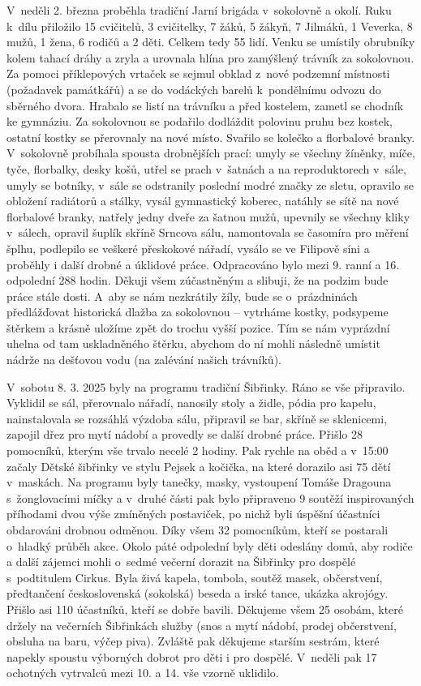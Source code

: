 \documentclass[11pt]{article}
\begin{document}
V~neděli 2. března proběhla tradiční Jarní brigáda v~sokolovně a okolí.
Ruku k~dílu přiložilo 15 cvičitelů, 3 cvičitelky, 7 žáků, 5 žákyň, 7
Jilmáků, 1
Veverka, 8 mužů, 1 žena, 6 rodičů a 2 děti. Celkem tedy 55 lidí.
Venku se umístily obrubníky kolem tahací dráhy a zryla a urovnala hlína
pro
zamýšlený trávník za sokolovnou. Za pomoci příklepových vrtaček se
sejmul
obklad z~nové podzemní místnosti (požadavek památkářů) a 
se
do vodáckých barelů k~pondělnímu odvozu do sběrného dvora. Hrabalo se
listí
na trávníku a před kostelem, zametl se chodník ke gymnáziu. Za
sokolovnou
se podařilo dodláždit polovinu pruhu bez kostek, ostatní kostky se
přerovnaly
na nové místo. Svařilo se kolečko a florbalové branky.
V~sokolovně probíhala spousta drobnějších prací: umyly se všechny
žíněnky, míče, tyče, florbalky, desky košů, utřel se prach v~šatnách a
na reproduktorech v~sále, umyly se
botníky, v~sále se odstranily poslední modré značky ze sletu, opravilo
se
obložení radiátorů a stálky, vysál gymnastický koberec, natáhly se sítě
na
nové florbalové branky, natřely jedny dveře za šatnou mužů, upevnily se
všechny kliky v~sálech, opravil šuplík skříně Srncova sálu, namontovala
se
časomíra pro měření šplhu, podlepilo se veškeré přeskokové nářadí,
vysálo
se ve Filipově síni a proběhly i další drobné a úklidové práce.
Odpracováno bylo mezi 9. ranní a 16. odpolední 288 hodin. Děkuji všem
zúčastněným a slibuji, že na podzim bude práce stále dosti. A~aby se nám
nezkrátily žíly, bude se o~prázdninách předlážďovat historická dlažba za
sokolovnou -- vytrháme kostky, podsypeme štěrkem a krásně uložíme zpět
do trochu vyšší pozice. Tím se nám vyprázdní uhelna od tam uskladněného
štěrku, abychom do ní mohli následně umístit nádrže na dešťovou vodu (na
zalévání našich trávníků).

V~sobotu 8. 3. 2025 byly na programu tradiční Šibřinky. Ráno se vše
připravilo. Vyklidil se sál, přerovnalo nářadí, nanosily stoly a židle,
pódia
pro kapelu, nainstalovala se rozsáhlá výzdoba sálu, připravil se bar,
skříně se
sklenicemi, zapojil dřez pro mytí nádobí a provedly se další drobné
práce.
Přišlo 28 pomocníků, kterým vše trvalo necelé 2 hodiny. Pak rychle na
oběd
a v~15:00 začaly Dětské šibřinky ve stylu Pejsek a kočička, na které
dorazilo asi 75 dětí v~maskách. Na programu byly tanečky, masky,
vystoupení Tomáše Dragouna s~žonglovacími míčky a v~druhé části pak
bylo připraveno 9 soutěží inspirovaných příhodami dvou výše zmíněných
postaviček, po nichž byli úspěšní účastníci obdarováni drobnou odměnou.
Díky všem 32 pomocníkům, kteří se postarali o~hladký průběh akce. Okolo
páté odpolední byly děti odeslány domů, aby rodiče a další zájemci mohli
o~sedmé večerní dorazit na Šibřinky pro dospělé s~podtitulem Cirkus. Byla
živá kapela, tombola, soutěž masek, občerstvení, předtančení
československá (sokolská) beseda a irské tance, ukázka akrojógy. Přišlo
asi 110 účastníků, kteří se dobře bavili.
Děkujeme všem 25 osobám, které držely na večerních Šibřinkách služby
(snos a mytí nádobí, prodej občerstvení, obsluha na baru, výčep piva).
Zvláště pak děkujeme starším sestrám, které napekly spoustu výborných
dobrot pro děti i pro dospělé.
V~neděli pak 17 ochotných vytrvalců mezi 10. a 14. vše vzorně uklidilo.
\end{document}
